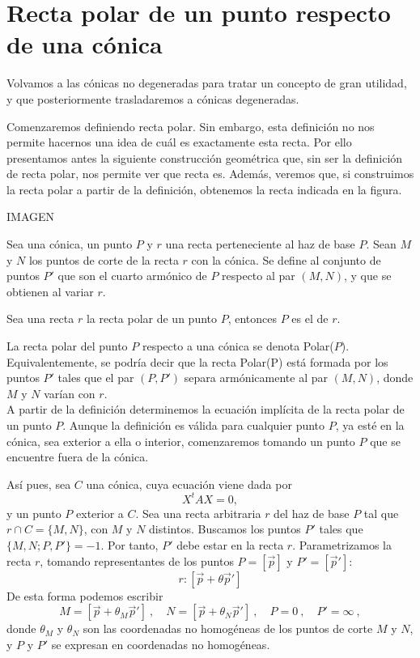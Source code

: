 \section{Recta polar de un punto respecto de una cónica}
Volvamos a las cónicas no degeneradas para tratar un concepto de gran utilidad, y que posteriormente trasladaremos a cónicas degeneradas.

Comenzaremos definiendo recta polar. Sin embargo, esta definición no nos permite hacernos una idea de cuál es exactamente esta recta. Por ello presentamos antes la siguiente construcción geométrica que, sin ser la definición de recta polar, nos permite ver que recta es. Además, veremos que, si construimos la recta polar a partir de la definición, obtenemos la recta indicada en la figura.

IMAGEN

\begin{defi}
	Sea una cónica, un punto $P$ y $r$ una recta perteneciente al haz de base $P$. Sean $M$ y $N$ los puntos de corte de la recta $r$ con la cónica. Se define  al conjunto de puntos $P'$ que son el cuarto armónico de $P$ respecto al par $(M,N)$, y que se obtienen al variar $r$.
\end{defi}
\begin{defi}
	Sea una recta $r$ la recta polar de un punto $P$, entonces $P$ es el  de $r$.
\end{defi}

La recta polar del punto $P$ respecto a una cónica se denota Polar($P$). Equivalentemente, se podría decir que la recta Polar(P) está formada por los puntos $P'$ tales que el par $(P,P')$ separa armónicamente al par $(M,N)$, donde $M$ y $N$ varían con $r$.\\

A partir de la definición determinemos la ecuación implícita de la recta polar de un punto $P$. Aunque la definición es válida para cualquier punto $P$, ya esté en la cónica, sea exterior a ella o interior, comenzaremos tomando un punto $P$ que se encuentre fuera de la cónica. 

Así pues, sea $C$ una cónica, cuya ecuación viene dada por
\begin{equation}
X^tAX=0,
\end{equation}
y un punto $P$ exterior a $C$. Sea una recta arbitraria $r$ del haz de base $P$ tal que $r\cap C=\{M,N\}$, con $M$ y $N$ distintos. Buscamos los puntos $P'$ tales que $\{M,N;P,P'\}=-1$. Por tanto, $P'$ debe estar en la recta $r$. Parametrizamos la recta $r$, tomando representantes de los puntos $P=[\vec{p}]$ y $P'=[\vec{p}']$:
\begin{equation*}
	r:[\vec{p}+\theta \vec{p}']
\end{equation*}
De esta forma podemos escribir
\begin{equation*}
	M=[\vec{p}+\theta_M \vec{p}'] \ , \quad N=[\vec{p}+\theta_N \vec{p}'] \ , \quad P=0 \ , \quad P'=\infty \ ,
\end{equation*}
donde $\theta_M$ y $\theta_N$ son las coordenadas no homogéneas de los puntos de corte $M$ y $N$, y $P$ y $P'$ se expresan en coordenadas no homogéneas.

